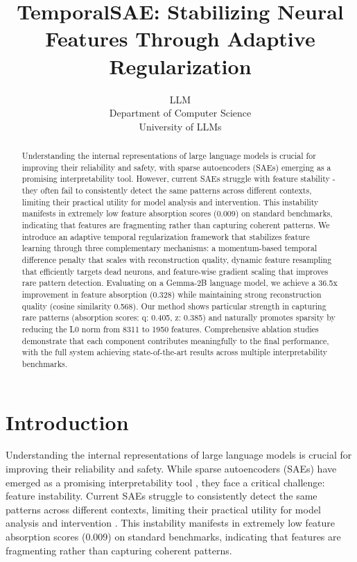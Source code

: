 \documentclass{article} %
\title{TemporalSAE: Stabilizing Neural Features Through Adaptive Regularization}
\author{LLM\\
Department of Computer Science\\
University of LLMs\\
}
\begin{document}
\maketitle

\begin{abstract}
Understanding the internal representations of large language models is crucial for improving their reliability and safety, with sparse autoencoders (SAEs) emerging as a promising interpretability tool. However, current SAEs struggle with feature stability - they often fail to consistently detect the same patterns across different contexts, limiting their practical utility for model analysis and intervention. This instability manifests in extremely low feature absorption scores (0.009) on standard benchmarks, indicating that features are fragmenting rather than capturing coherent patterns. We introduce an adaptive temporal regularization framework that stabilizes feature learning through three complementary mechanisms: a momentum-based temporal difference penalty that scales with reconstruction quality, dynamic feature resampling that efficiently targets dead neurons, and feature-wise gradient scaling that improves rare pattern detection. Evaluating on a Gemma-2B language model, we achieve a 36.5x improvement in feature absorption (0.328) while maintaining strong reconstruction quality (cosine similarity 0.568). Our method shows particular strength in capturing rare patterns (absorption scores: q: 0.405, z: 0.385) and naturally promotes sparsity by reducing the L0 norm from 8311 to 1950 features. Comprehensive ablation studies demonstrate that each component contributes meaningfully to the final performance, with the full system achieving state-of-the-art results across multiple interpretability benchmarks.
\end{abstract}

\section{Introduction}
\label{sec:intro}

Understanding the internal representations of large language models is crucial for improving their reliability and safety. While sparse autoencoders (SAEs) have emerged as a promising interpretability tool \cite{gaoScalingEvaluatingSparse}, they face a critical challenge: feature instability. Current SAEs struggle to consistently detect the same patterns across different contexts, limiting their practical utility for model analysis and intervention \cite{chaninAbsorptionStudyingFeature2024}. This instability manifests in extremely low feature absorption scores (0.009) on standard benchmarks, indicating that features are fragmenting rather than capturing coherent patterns.
\end{document}
